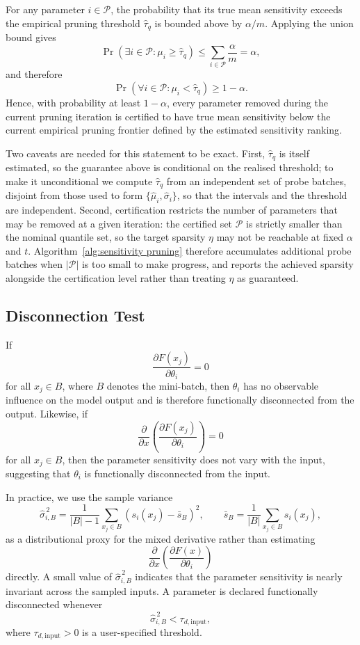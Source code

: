 \documentclass{article}
\theoremstyle{definition}
\theoremstyle{remark}
\begin{document}
For any parameter $i\in\mathcal P$, the probability that its true mean sensitivity exceeds the empirical pruning threshold $\hat{\tau}_q$ is bounded above by $\alpha/m$. Applying the union bound gives
\[
\Pr\!\left(
\exists i\in\mathcal P :
\mu_i \ge \hat{\tau}_q
\right)
\le
\sum_{i\in\mathcal P}\frac{\alpha}{m}
=
\alpha,
\]
and therefore
\[
\Pr\!\left(
\forall i\in\mathcal P :
\mu_i < \hat{\tau}_q
\right)
\ge
1-\alpha.
\]
Hence, with probability at least $1-\alpha$, every parameter removed during the
current pruning iteration is certified to have true mean sensitivity below the
current empirical pruning frontier defined by the estimated sensitivity ranking.

Two caveats are needed for this statement to be exact. First, $\hat{\tau}_q$ is
itself estimated, so the guarantee above is conditional on the realised
threshold; to make it unconditional we compute $\hat{\tau}_q$ from an
independent set of probe batches, disjoint from those used to form
$\{\hat{\mu}_i,\hat{\sigma}_i\}$, so that the intervals and the threshold are
independent. Second, certification restricts the number of parameters that may
be removed at a given iteration: the certified set $\mathcal P$ is strictly
smaller than the nominal quantile set, so the target sparsity $\eta$ may not be
reachable at fixed $\alpha$ and $t$. Algorithm~\ref{alg:sensitivity pruning}
therefore accumulates additional probe batches when
$|\mathcal P|$ is too small to make progress, and reports the achieved sparsity
alongside the certification level rather than treating $\eta$ as guaranteed.

\subsection{Disconnection Test}

If
\[
\frac{\partial F(x_j)}{\partial \theta_i}=0
\]
for all \(x_j\in B\), where \(B\) denotes the mini-batch, then \(\theta_i\) has no observable influence on the model output and is therefore functionally disconnected from the output. Likewise, if
\[
\frac{\partial}{\partial x}
\left(
\frac{\partial F(x_j)}{\partial\theta_i}
\right)=0
\]
for all \(x_j\in B\), then the parameter sensitivity does not vary with the input, suggesting that \(\theta_i\) is functionally disconnected from the input.

In practice, we use the sample variance
\[
\widehat{\sigma}_{i,B}^{\,2}
=
\frac{1}{|B|-1}
\sum_{x_j\in B}
\left(
s_i(x_j)-\bar s_B
\right)^2,
\qquad
\bar s_B
=
\frac{1}{|B|}
\sum_{x_j\in B}
s_i(x_j),
\]
as a distributional proxy for the mixed derivative rather than estimating
\[
\frac{\partial}{\partial x}
\left(
\frac{\partial F(x)}{\partial\theta_i}
\right)
\]
directly. A small value of \(\widehat{\sigma}_{i,B}^{\,2}\) indicates that the parameter sensitivity is nearly invariant across the sampled inputs. A parameter is declared functionally disconnected whenever
\[
\widehat{\sigma}_{i,B}^{\,2}<\tau_{d,\mathrm{input}},
\]
where \(\tau_{d,\mathrm{input}}>0\) is a user-specified threshold.
\end{document}
